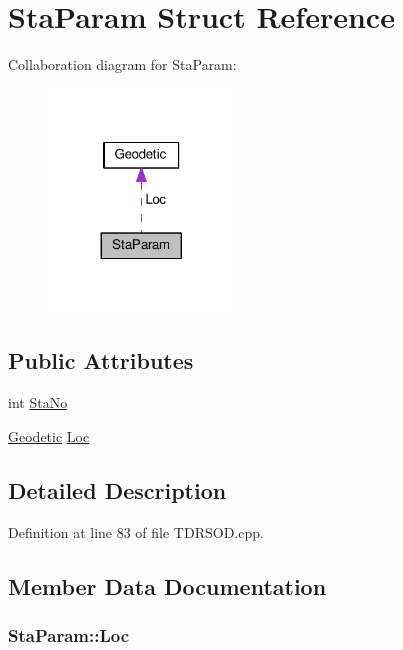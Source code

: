 \hypertarget{structStaParam}{\section{Sta\-Param Struct Reference}
\label{structStaParam}
}


Collaboration diagram for Sta\-Param\-:\nopagebreak
\begin{figure}[H]
\begin{center}
\leavevmode
\includegraphics[width=140pt]{structStaParam__coll__graph}
\end{center}
\end{figure}
\subsection*{Public Attributes}
\begin{DoxyCompactItemize}
\item 
int \hyperlink{structStaParam_a74ee32501a8df6cf68720c4085e73d40}{Sta\-No}
\item 
\hyperlink{classGeodetic}{Geodetic} \hyperlink{structStaParam_af67367077a3098a392fc1c86bbf0f55f}{Loc}
\end{DoxyCompactItemize}


\subsection{Detailed Description}


Definition at line 83 of file T\-D\-R\-S\-O\-D.\-cpp.



\subsection{Member Data Documentation}
\hypertarget{structStaParam_af67367077a3098a392fc1c86bbf0f55f}{
\subsubsection[{Loc}]{ Sta\-Param\-::\-Loc}}\label{structStaParam_af67367077a3098a392fc1c86bbf0f55f}



